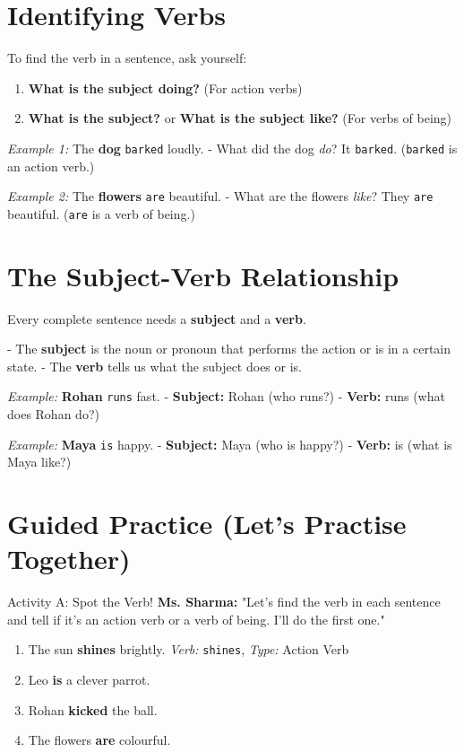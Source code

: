 \section{Identifying Verbs}
To find the verb in a sentence, ask yourself:
\begin{enumerate}
    \item \textbf{What is the subject doing?} (For action verbs)
    \item \textbf{What is the subject?} or \textbf{What is the subject like?} (For verbs of being)
\end{enumerate}

\textit{Example 1:} The \textbf{dog} \texttt{barked} loudly.
- What did the dog \textit{do}? It \texttt{barked}. (\texttt{barked} is an action verb.)

\textit{Example 2:} The \textbf{flowers} \texttt{are} beautiful.
- What are the flowers \textit{like}? They \texttt{are} beautiful. (\texttt{are} is a verb of being.)

\section{The Subject-Verb Relationship}
Every complete sentence needs a \textbf{subject} and a \textbf{verb}.

- The \textbf{subject} is the noun or pronoun that performs the action or is in a certain state.
- The \textbf{verb} tells us what the subject does or is.

\textit{Example:} \textbf{Rohan} \texttt{runs} fast.
- \textbf{Subject:} Rohan (who runs?)
- \textbf{Verb:} runs (what does Rohan do?)

\textit{Example:} \textbf{Maya} \texttt{is} happy.
- \textbf{Subject:} Maya (who is happy?)
- \textbf{Verb:} is (what is Maya like?)

\section{Guided Practice (Let's Practise Together)}
\begin{activitybox}{Activity A: Spot the Verb!}
\textbf{Ms. Sharma:} "Let's find the verb in each sentence and tell if it's an action verb or a verb of being. I'll do the first one."
\begin{enumerate}
    \item The sun \textbf{shines} brightly.
    \textit{Verb:} \texttt{shines}, \textit{Type:} Action Verb
    \item Leo \textbf{is} a clever parrot.
    \item Rohan \textbf{kicked} the ball.
    \item The flowers \textbf{are} colourful.
\end{enumerate}
\end{activitybox}

